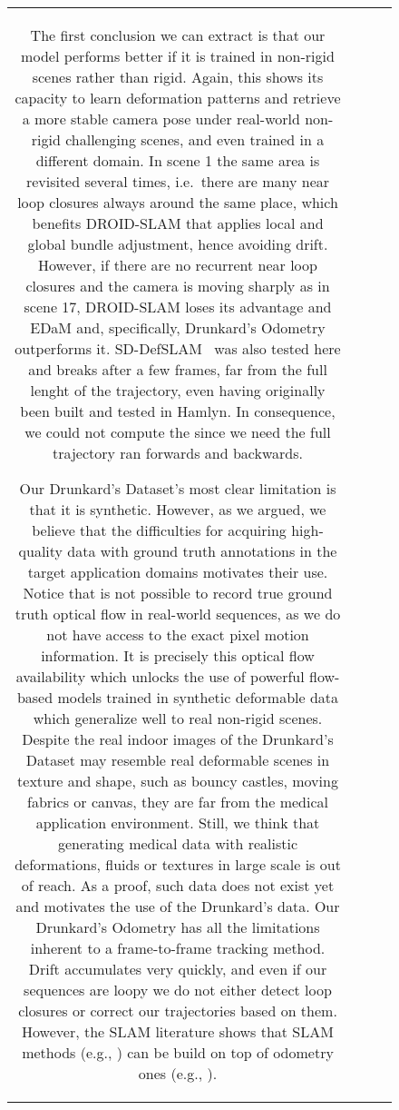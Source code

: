 \documentclass{article}
\newcommand{\boldparagraph}[1]{\vspace{0.0em}\noindent{\bf #1}}
\begin{document}
\begin{figure}
\begin{tabular}{cccc}
The first conclusion we can extract is that our model performs better if it is trained in non-rigid scenes rather than rigid. Again, this shows its capacity to learn deformation patterns and retrieve a more stable camera pose under real-world non-rigid challenging scenes, and even trained in a different domain. In scene 1 the same area is revisited several times, i.e.\ there are many near loop closures always around the same place, which benefits DROID-SLAM that applies local and global bundle adjustment, hence avoiding drift. However, if there are no recurrent near loop closures and the camera is moving sharply as in scene 17, DROID-SLAM loses its advantage and EDaM and, specifically, Drunkard's Odometry outperforms it.
SD-DefSLAM~\cite{gomez2021sd} was also tested here and breaks after a few frames, far from the full lenght of the trajectory, even having originally been built and tested in Hamlyn. In consequence, we could not compute the  since we need the full trajectory ran forwards and backwards.


\boldparagraph{Limitations.}
\label{sec:limitations}
Our Drunkard's Dataset's most clear limitation is that it is synthetic. However, as we argued, we believe that the difficulties for acquiring high-quality data with ground truth annotations in the target application domains motivates their use. Notice that is not possible to record true ground truth optical flow in real-world sequences, as we do not have access to the exact pixel motion information. It is precisely this optical flow availability which unlocks the use of powerful flow-based models trained in synthetic deformable data which generalize well to real non-rigid scenes. Despite the real indoor images of the Drunkard's Dataset may resemble real deformable scenes in texture and shape, such as bouncy castles, moving fabrics or canvas, they are far from the medical application environment. Still, we think that generating medical data with realistic deformations, fluids or textures in large scale is out of reach. As a proof, such data does not exist yet and motivates the use of the Drunkard's data.
Our Drunkard's Odometry has all the limitations inherent to a frame-to-frame tracking method. Drift accumulates very quickly, and even if our sequences are loopy we do not either detect loop closures or correct our trajectories based on them. However, the SLAM literature shows that SLAM methods (e.g., \cite{gao2018ldso}) can be build on top of odometry ones (e.g., \cite{engel2017direct}). 



\end{tabular}
\end{figure}
\end{document}
